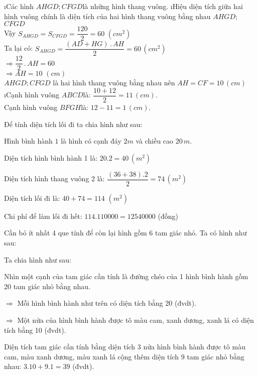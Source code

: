 \begin{Answer}{9}
		\begin{enumerate}[a), leftmargin=*]
			\i Các hình $AHGD;CFGD$là những hình thang vuông.
			\i Hiệu diện tích giữa hai hình vuông chính là diện tích của hai hình thang vuông bằng nhau $AHGD$; $CFGD$\\
			Vậy ${{S}_{AHGD}}={{S}_{CFGD}}=\dfrac{120}{2}=60\,\,(cm^2)$\\
			Ta lại có: ${{S}_{AHGD}}=\dfrac{(AD+HG)\,.\,AH}{2}=60\,(cm^2)$\\
			$\Rightarrow \dfrac{12}{2}\,.\,AH=60$ \\
			$\Rightarrow AH=10\,\,(cm)$ \\
			$AHGD;CFGD$ là hai hình thang vuông bằng nhau nên $AH=CF=10\,(cm)$
			\i Cạnh hình vuông $ABCD$là: $\dfrac{10+12}{2}=11\,(cm)$.\\
			Cạnh hình vuông $BFGH$là: $12-11=1\,(cm)$.
		\end{enumerate}
	
\end{Answer}
\begin{Answer}{10}
		Để tính diện tích lối đi ta chia hình như sau:
		
		Hình bình hành $1$ là hình có cạnh đáy $2m$ và chiều cao $20\,m$.
		
		Diện tích hình bình hành 1 là: $20.2=40\,(m^2)$
		
		Diện tích hình thang vuông 2 là: $\dfrac{(36+38).2}{2}=74\,(m^2)$
		
		Diện tích lối đi là: $40+74=114\,\,(m^2)$
		
		Chi phí để làm lối đi hết: $114.110000=12540000$ (đồng)
	
\end{Answer}
\begin{Answer}{11}
		Cần bỏ ít nhất 4 que tính để còn lại hình gồm 6 tam giác nhỏ.
		Ta có hình như sau:
		
	
\end{Answer}
\begin{Answer}{12}
		Ta chia hình như sau:
		
		Nhìn một cạnh của tam giác cần tính là đường chéo của 1 hình bình hành gồm 20 tam giác nhỏ bằng nhau.
		
		$\Rightarrow$ Mỗi hình bình hành như trên có diện tích bằng 20 (đvdt).
		
		$\Rightarrow$ Một nửa của hình bình hành được tô màu cam, xanh dương, xanh lá có diện tích bằng 10 (đvdt).
		
		Diện tích tam giác cần tính bằng diện tích 3 nửa hình bình hành được tô màu cam, màu xanh dương, màu xanh lá cộng thêm diện tích 9 tam giác nhỏ bằng nhau: $3.10+9.1=39$ (đvdt).
	
\end{Answer}
